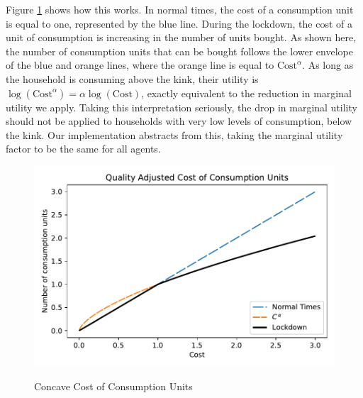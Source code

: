 \documentclass[./ConsumptionResponse]{subfiles}
\begin{document}
Figure \ref{concave_cons} shows how this works.
In normal times, the cost of a consumption unit is equal to one, represented by the blue line.
During the lockdown, the cost of a unit of consumption is increasing in the number of units bought.
As shown here, the number of consumption units that can be bought follows the lower envelope of the blue and orange lines, where the orange line is equal to $\text{Cost}^\alpha$.
As long as the household is consuming above the kink, their utility is $\log (\text{Cost}^\alpha) = \alpha \log (\text{Cost})$, exactly equivalent to the reduction in marginal utility we apply. Taking this interpretation seriously, the drop in marginal utility should not be applied to households with very low levels of consumption, below the kink.
Our implementation abstracts from this, taking the marginal utility factor to be the same for all agents.
\begin{figure}
	\centering
	\caption{Concave Cost of Consumption Units}
	\label{concave_cons}
	{ \includegraphics[width=8in]{./Figures/QualityCost}}
\end{figure}
\end{document}
